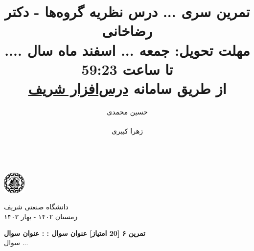 \documentclass{article}
\title{
	\vspace{-0.8em}
تمرین سری ... درس نظریه گروه‌ها - دکتر رضاخانی
\\
{\normalsize
\textbf{مهلت تحویل:
جمعه ... اسفند ماه سال .... تا ساعت 59:23
\\
\vspace{-0.4em}
از طریق سامانه
\href{https://cw.sharif.edu/}{درس‌افزار شریف}
}
}
\vspace{-0.6em}
}
\author{
حسین محمدی\\
  \lr{
  		\href{mailto:hossein.mohammadi.00427@gmail.com}{\texttt{	hossein.mohammadi.00427@gmail.com}}} \\
  \And
  زهرا کبیری\\
 \lr{
  		\href{mailto:kabiri.zahra98@gmail.com}{ \texttt{kabiri.zahra98@gmail.com}}}\\
  }
\newenvironment{exercise}[3][\unskip]{%
	\par
	\noindent
	\textbf{تمرین
		#1
		[#2 امتیاز] 
		\def\temp{#3}\ifx\temp\empty
		: 
		\else
		: #3 \vspace{0.5em} \\ \noindent
		\fi
}}{}
\begin{document}
\begin{minipage}{0.1\textwidth}%
\includegraphics[width=1.1cm]{sharif-logo.png}
\end{minipage}%
\hfill%
\begin{minipage}{0.9\textwidth}\raggedleft
دانشگاه صنعتی شریف\\
زمستان ۱۴۰۲ - بهار ۱۴۰۳\\
\end{minipage}

\makepertitle


\begin{exercise}[۶]{20}{عنوان سوال}
	سوال ...
	
\end{exercise}

\vspace{1em}
 
\end{document}
